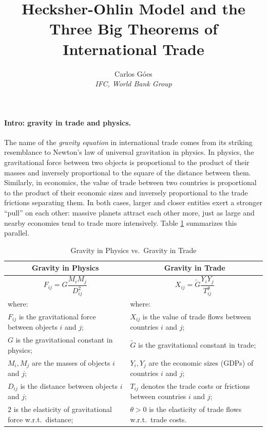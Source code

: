 \documentclass[11pt,letterpaper]{article}
\begin{document}
\title{\textbf{Hecksher-Ohlin Model and the Three Big Theorems of International Trade}}
\author{\large%
\setcounter{footnote}{0}%
Carlos G\'{o}es \\[-3pt] \textit{\small IFC, World Bank Group}
}
\maketitle

\paragraph{Intro: gravity in trade and physics.} 
The name of the \textit{gravity equation} in international trade comes from its striking resemblance to Newton’s law of universal gravitation in physics.  In physics, the gravitational force between two objects is proportional to the product of their masses and inversely proportional to the square of the distance between them.  Similarly, in economics, the value of trade between two countries is proportional to the product of their economic sizes and inversely proportional to the trade frictions separating them. In both cases, larger and closer entities exert a stronger “pull” on each other: massive planets attract each other more, just as large and nearby economies tend to trade more intensively.  Table \ref{tab:gravity-comparison} summarizes this parallel.

\begin{table}[htbp!]
\centering
\renewcommand{\arraystretch}{1.4}
\begin{tabular}{p{} p{}}
\multicolumn{1}{c}{\textbf{Gravity in Physics}} & 
\multicolumn{1}{c}{\textbf{Gravity in Trade}} \\[4pt]
\hline
\[
F_{ij} = G \frac{M_i M_j}{D_{ij}^{2}}
\] &
\[
X_{ij} = \tilde{G} \frac{Y_i Y_j}{T_{ij}^{\theta}}
\] \\[4pt]
where: &
where: \\[2pt]
$F_{ij}$ is the gravitational force between objects $i$ and $j$; &
$X_{ij}$ is the value of trade flows between countries $i$ and $j$; \\[2pt]
$G$ is the gravitational constant in physics; &
$\tilde{G}$ is the gravitational constant in trade; \\[2pt]
$M_i, M_j$ are the masses of objects $i$ and $j$; &
$Y_i, Y_j$ are the economic sizes (GDPs) of countries $i$ and $j$; \\[2pt]
$D_{ij}$ is the distance between objects $i$ and $j$; &
$T_{ij}$ denotes the trade costs or frictions between countries $i$ and $j$; \\[2pt]
$2$ is the elasticity of gravitational force w.r.t.\ distance; &
$\theta > 0$ is the elasticity of trade flows w.r.t.\ trade costs. \\[4pt]
\hline
\end{tabular}
\caption{Gravity in Physics vs.\ Gravity in Trade}
\label{tab:gravity-comparison}
\end{table}
\end{document}
